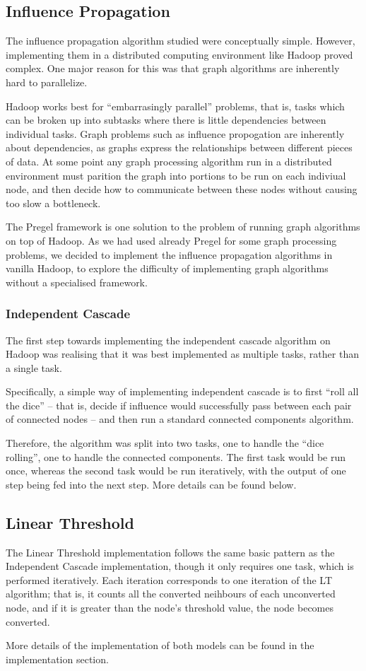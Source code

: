 \subsection{Influence Propagation}

The influence propagation algorithm studied were conceptually simple. However, implementing them in a distributed computing environment like Hadoop proved complex. One major reason for this was that graph algorithms are inherently hard to parallelize. 

Hadoop works best for ``embarrasingly parallel'' problems, that is, tasks which can be broken up into subtasks where there is little dependencies between individual tasks. Graph problems such as influence propogation are inherently about dependencies, as graphs express the relationships between different pieces of data. At some point any graph processing algorithm run in a distributed environment must parition the graph into portions to be run on each indiviual node, and then decide how to communicate between these nodes without causing too slow a bottleneck.

The Pregel framework is one solution to the problem of running graph algorithms on top of Hadoop. As we had used already Pregel for some graph processing problems, we decided to implement the influence propagation algorithms in vanilla Hadoop, to explore the difficulty of implementing graph algorithms without a specialised framework.

\subsubsection{Independent Cascade}

The first step towards implementing the independent cascade algorithm on Hadoop was realising that it was best implemented as multiple tasks, rather than a single task.

Specifically, a simple way of implementing independent cascade is to first ``roll all the dice'' -- that is, decide if influence would successfully pass between each pair of connected nodes -- and then run a standard connected components algorithm.

Therefore, the algorithm was split into two tasks, one to handle the ``dice rolling'', one to handle the connected components. The first task would be run once, whereas the second task would be run iteratively, with the output of one step being fed into the next step. More details can be found below.

\subsection{Linear Threshold}

The Linear Threshold implementation follows the same basic pattern as the Independent Cascade implementation, though it only requires one task, which is performed iteratively. Each iteration corresponds to one iteration of the LT algorithm; that is, it counts all the converted neihbours of each unconverted node, and if it is greater than the node's threshold value, the node becomes converted.

More details of the implementation of both models can be found in the implementation section.
